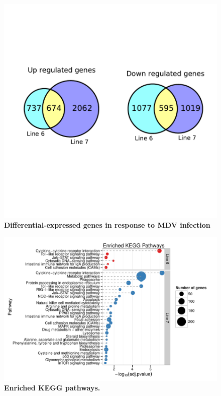 \documentclass[10pt]{article}
\begin{document}
\begin{figure}[!ht]
    \begin{center}
        \includegraphics[width=6in]{degenes_venn.pdf}
    \end{center}
    \caption{
        {\bf Differential-expressed genes in response to MDV infection}
    }
    \label{degenes_venn}
\end{figure}

\begin{figure}[!ht]
    \begin{center}
        \includegraphics[width=7in]{line67_KEGG_cleveland.pdf}
    \end{center}
    \caption{
        {\bf Enriched KEGG pathways.}
    }
    \label{line67_kegg}
\end{figure}
\end{document}
